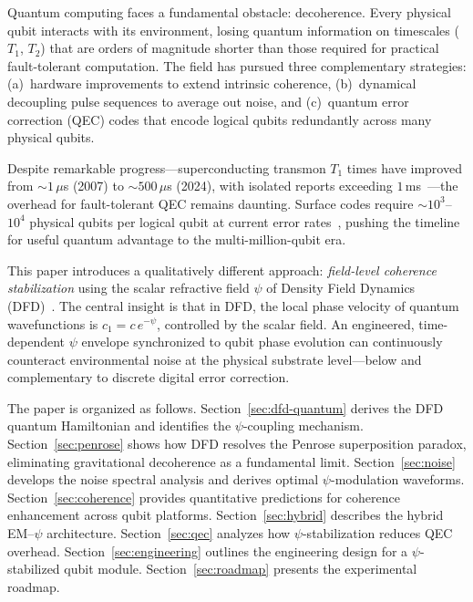 \documentclass[aps,prd,twocolumn,superscriptaddress,nofootinbib]{revtex4-2}
\begin{document}
Quantum computing faces a fundamental obstacle: decoherence. Every
physical qubit interacts with its environment, losing quantum information
on timescales ($T_1$, $T_2$) that are orders of magnitude shorter than
those required for practical fault-tolerant computation. The field has
pursued three complementary strategies: (a)~hardware improvements to
extend intrinsic coherence, (b)~dynamical decoupling pulse sequences to
average out noise, and (c)~quantum error correction (QEC) codes that
encode logical qubits redundantly across many physical qubits.

Despite remarkable progress---superconducting transmon $T_1$ times have
improved from $\sim 1\,\mu$s (2007) to $\sim 500\,\mu$s (2024), with
isolated reports exceeding $1\,$ms~\cite{Wang2022,Place2021,Somoroff2023}---the
overhead for fault-tolerant QEC remains daunting. Surface codes require
$\sim 10^3$--$10^4$ physical qubits per logical qubit at current error
rates~\cite{Fowler2012,Google2023}, pushing the timeline for useful
quantum advantage to the multi-million-qubit era.

This paper introduces a qualitatively different approach: \emph{field-level
coherence stabilization} using the scalar refractive field $\psi$ of
Density Field Dynamics (DFD)~\cite{Alcock2025DFD}. The central insight
is that in DFD, the local phase velocity of quantum wavefunctions is
$c_1 = c\,e^{-\psi}$, controlled by the scalar field. An engineered,
time-dependent $\psi$ envelope synchronized to qubit phase evolution can
continuously counteract environmental noise at the physical substrate
level---below and complementary to discrete digital error correction.

The paper is organized as follows. Section~\ref{sec:dfd-quantum} derives
the DFD quantum Hamiltonian and identifies the $\psi$-coupling mechanism.
Section~\ref{sec:penrose} shows how DFD resolves the Penrose
superposition paradox, eliminating gravitational decoherence as a
fundamental limit. Section~\ref{sec:noise} develops the noise spectral
analysis and derives optimal $\psi$-modulation waveforms.
Section~\ref{sec:coherence} provides quantitative predictions for
coherence enhancement across qubit platforms.
Section~\ref{sec:hybrid} describes the hybrid EM--$\psi$ architecture.
Section~\ref{sec:qec} analyzes how $\psi$-stabilization reduces QEC
overhead. Section~\ref{sec:engineering} outlines the engineering design
for a $\psi$-stabilized qubit module. Section~\ref{sec:roadmap}
presents the experimental roadmap.

\end{document}
